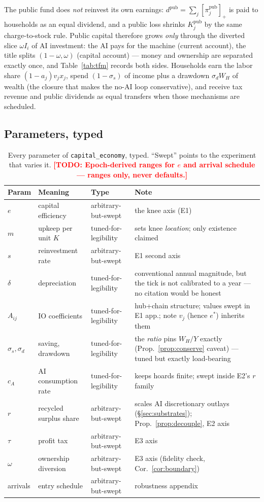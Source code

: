 \documentclass[11pt]{article}
\newcommand{\relu}[1]{\left[#1\right]_+}
\newcommand{\TODO}[1]{\textcolor{red}{\textbf{[TODO: #1]}}}
\begin{document}
The public fund does \emph{not} reinvest its own earnings:
$d^{\mathrm{pub}} = \sum_j \relu{\pi^{\mathrm{pub}}_j}$ is paid to
households as an equal dividend, and a public loss shrinks
$K^{\mathrm{pub}}_j$ by the same charge-to-stock rule. Public capital
therefore grows \emph{only} through the diverted slice $\omega I_i$ of AI
investment: the AI pays for the machine (current account), the title splits
$(1-\omega, \omega)$ (capital account) --- money and ownership are separated
exactly once, and Table~\ref{tab:tfm} records both sides. Households earn
the labor share $(1-a_j)v_j x_j$, spend $(1-\sigma_s)$ of income plus a
drawdown $\sigma_d W_H$ of wealth (the closure that makes the no-AI loop
conservative), and receive tax revenue and public dividends as equal
transfers when those mechanisms are scheduled.

\subsection{Parameters, typed}\label{sec:params}

\begin{table}[t]
\centering\small
\caption{Every parameter of \texttt{capital\_economy}, typed. ``Swept''
points to the experiment that varies it. \TODO{Epoch-derived ranges for $e$
and arrival schedule --- ranges only, never defaults.}\label{tab:params}}
\begin{tabular}{llll}
\toprule
Param & Meaning & Type & Note\\
\midrule
$e$ & capital efficiency & arbitrary-but-swept & the knee axis (E1)\\
$m$ & upkeep per unit $K$ & tuned-for-legibility & sets knee \emph{location}; only existence claimed\\
$s$ & reinvestment rate & arbitrary-but-swept & E1 second axis\\
$\delta$ & depreciation & tuned-for-legibility & conventional annual magnitude, but the tick is not calibrated to a year --- no citation would be honest\\
$A_{ij}$ & IO coefficients & tuned-for-legibility & hub+chain structure; values swept in E1 app.; note $v_j$ (hence $e^{*}$) inherits them\\
$\sigma_s, \sigma_d$ & saving, drawdown & tuned-for-legibility & the \emph{ratio} pins $W_H/Y$ exactly (Prop.~\ref{prop:conserve} caveat) --- tuned but exactly load-bearing\\
$c_A$ & AI consumption rate & tuned-for-legibility & keeps hoards finite; swept inside E2's $r$ family\\
$r$ & recycled surplus share & arbitrary-but-swept & scales AI discretionary outlays (\S\ref{sec:substrates}); Prop.~\ref{prop:decouple}, E2 axis\\
$\tau$ & profit tax & arbitrary-but-swept & E3 axis\\
$\omega$ & ownership diversion & arbitrary-but-swept & E3 axis (fidelity check, Cor.~\ref{cor:boundary})\\
arrivals & entry schedule & arbitrary-but-swept & robustness appendix\\
\bottomrule
\end{tabular}
\end{table}
\end{document}
